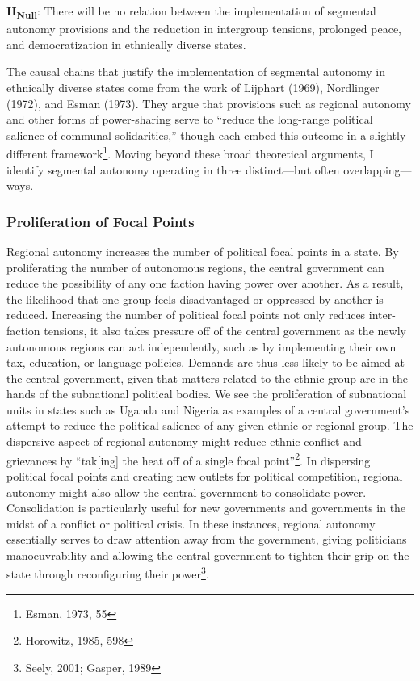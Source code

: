 \documentclass[12pt]{article}
\begin{document}
\textbf{H\textsubscript{Null}}: There will be no relation between the implementation of segmental autonomy provisions and the reduction in intergroup tensions, prolonged peace, and democratization in ethnically diverse states. 

\doublespacing

The causal chains that justify the implementation of segmental autonomy in ethnically diverse states come from the work of Lijphart (1969), Nordlinger (1972), and Esman (1973). They argue that provisions such as regional autonomy and other forms of power-sharing serve to ``reduce the long-range political salience of communal solidarities,'' though each embed this outcome in a slightly different framework\footnote{Esman, 1973, 55}. Moving beyond these broad theoretical arguments, I identify segmental autonomy operating in three distinct---but often overlapping---ways. 

\subsubsection{Proliferation of Focal Points}
Regional autonomy increases the number of political focal points in a state. By proliferating the number of autonomous regions, the central government can reduce the possibility of any one faction having power over another. As a result, the likelihood that one group feels disadvantaged or oppressed by another is reduced. Increasing the number of political focal points not only reduces inter-faction tensions, it also takes pressure off of the central government as the newly autonomous regions can act independently, such as by implementing their own tax, education, or language policies. Demands are thus less likely to be aimed at the central government, given that matters related to the ethnic group are in the hands of the subnational political bodies. We see the proliferation of subnational units in states such as Uganda and Nigeria as examples of a central government’s attempt to reduce the political salience of any given ethnic or regional group. The dispersive aspect of regional autonomy might reduce ethnic conflict and grievances by ``tak[ing] the heat off of a single focal point''\footnote{Horowitz, 1985, 598}. In dispersing political focal points and creating new outlets for political competition, regional autonomy might also allow the central government to consolidate power. Consolidation is particularly useful for new governments and governments in the midst of a conflict or political crisis. In these instances, regional autonomy essentially serves to draw attention away from the government, giving politicians manoeuvrability and allowing the central government to tighten their grip on the state through reconfiguring their power\footnote{Seely, 2001; Gasper, 1989}.
\end{document}
